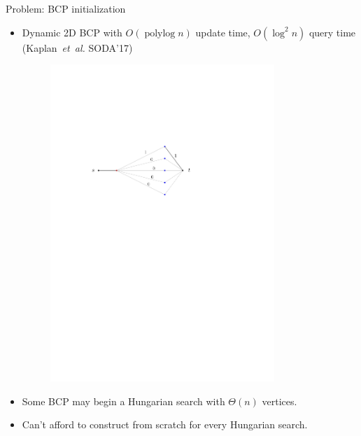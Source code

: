 \documentclass[xcolor={dvipsnames,usenames}]{beamer}
\newcommand{\etal}{\textit{et~al.}}
\DeclareMathOperator{\polylog}{polylog}
\begin{document}
\begin{frame}{Problem: BCP initialization}
\begin{itemize}
\item Dynamic 2D BCP with $O(\polylog n)$ update time, $O(\log^2 n)$ query time (Kaplan~{\etal} SODA'17)
\begin{figure}
\begin{center}
\includegraphics[width=0.8\textwidth,page=6]{why_dead}%
\end{center}
\end{figure}
\item Some BCP may begin a Hungarian search with $\Theta(n)$ vertices.
\item Can't afford to construct from scratch for every Hungarian search.
\end{itemize}
\end{frame}
\end{document}
